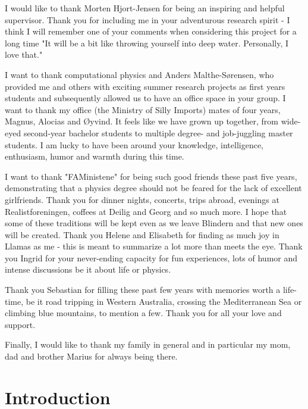 \documentclass[twoside,english]{uiofysmaster}
\begin{document}
\begin{acknowledgements}
I would like to thank Morten Hjort-Jensen for being an inspiring and helpful supervisor. Thank you for including me in your adventurous research spirit - I think I will remember one of your comments when considering this project for a long time "It will be a bit like throwing yourself into deep water. Personally, I love that."

I want to thank computational physics and Anders Malthe-Sørensen, who provided me and others with exciting summer research projects as first years students and subsequently allowed us to have an office space in your group. I want to thank my office (the Ministry of Silly Imports) mates of four years, Magnus, Alocias and Øyvind. It feels like we have grown up together, from wide-eyed second-year bachelor students to multiple degree- and job-juggling master students. I am lucky to have been around your knowledge, intelligence, enthusiasm, humor and warmth during this time.

I want to thank "FAMinistene" for being such good friends these past five years, demonstrating that a physics degree should not be feared for the lack of excellent girlfriends. Thank you for dinner nights, concerts, trips abroad, evenings at Realistforeningen, coffees at Deilig and Georg and so much more. I hope that some of these traditions will be kept even as we leave Blindern and that new ones will be created. Thank you Helene and Elisabeth for finding as much joy in Llamas as me - this is meant to summarize a lot more than meets the eye. Thank you Ingrid for your never-ending capacity for fun experiences, lots of humor and intense discussions be it about life or physics.

Thank you Sebastian for filling these past few years with memories worth a life-time, be it road tripping in Western Australia, crossing the Mediterranean Sea or climbing blue mountains, to mention a few. Thank you for all your love and support.

Finally, I would like to thank my family in general and in particular my mom, dad and brother Marius for always being there. 
\end{acknowledgements}

\tableofcontents

\chapter{Introduction}
\end{document}
